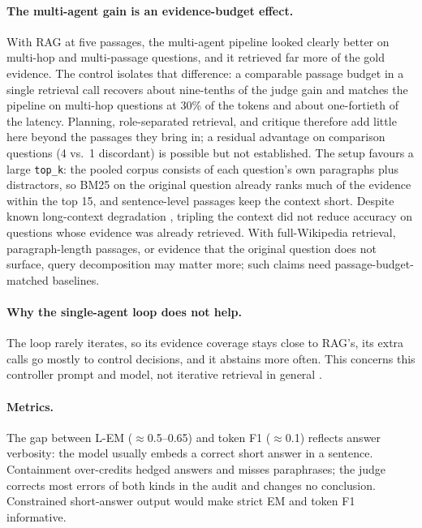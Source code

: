 \documentclass[11pt,a4paper]{article}
\newcommand{\lem}{L-EM}
\begin{document}
\paragraph{The multi-agent gain is an evidence-budget effect.}
With RAG at five passages, the multi-agent pipeline looked clearly better on
multi-hop and multi-passage questions, and it retrieved far more of the gold
evidence.
The control isolates that difference: a comparable passage budget in a single
retrieval call recovers about nine-tenths of the judge gain and matches the
pipeline on multi-hop questions at 30\% of the tokens and about one-fortieth
of the latency.
Planning, role-separated retrieval, and critique therefore add little here
beyond the passages they bring in; a residual advantage on comparison
questions (4 vs.\ 1 discordant) is possible but not established.
The setup favours a large \texttt{top\_k}: the pooled corpus consists of each
question's own paragraphs plus distractors, so BM25 on the original question
already ranks much of the evidence within the top 15, and sentence-level
passages keep the context short.
Despite known long-context degradation \citep{liu2024lost}, tripling the
context did not reduce accuracy on questions whose evidence was already
retrieved.
With full-Wikipedia retrieval, paragraph-length passages, or evidence that
the original question does not surface, query decomposition may matter more;
such claims need passage-budget-matched baselines.

\paragraph{Why the single-agent loop does not help.}
The loop rarely iterates, so its evidence coverage stays close to RAG's, its
extra calls go mostly to control decisions, and it abstains more often.
This concerns this controller prompt and model, not iterative retrieval in
general \citep{trivedi2023ircot,jiang2023flare}.

\paragraph{Metrics.}
The gap between \lem{} ($\approx$0.5--0.65) and token F1 ($\approx$0.1)
reflects answer verbosity: the model usually embeds a correct short answer in
a sentence.
Containment over-credits hedged answers and misses paraphrases; the judge
corrects most errors of both kinds in the audit and changes no conclusion.
Constrained short-answer output would make strict EM and token F1
informative.
\end{document}
